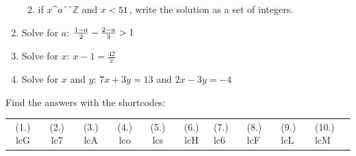 \begin{enumerate}[noitemsep, label=\textbf{\arabic*}. ]
\begin{enumerate}[noitemsep, label=\textbf{\alph*}. ]
\label{m39263*uid128}\item if \begin{math}x\^{a}ˆˆ\mathbb{Z}\end{math} and \begin{math}x<{}51\end{math}, write the solution as a set of integers.
\end{enumerate}
        \hspace{1ex}        
\label{m39263*uid129}\item Solve for \begin{math}a\end{math}: \begin{math}\frac{1-a}{2}-\frac{2-a}{3}>{}1\end{math}\hspace{1ex}        
\label{m39263*uid130}\item Solve for \begin{math}x\end{math}: \begin{math}x-1=\frac{42}{x}\end{math}\hspace{1ex}        
\label{m39263*uid131}\item Solve for \begin{math}x\end{math} and \begin{math}y\end{math}: \begin{math}7x+3y=13\end{math} and \begin{math}2x-3y=-4\end{math}\hspace{1ex}        
\end{enumerate}
        
      
    \label{m39263**end}
          
       
    
  \label{108b030756318cdc732e3f8c9c583cfb**end}
    
\par {} Find the answers with the shortcodes:
 \par \begin{tabular}[h]{cccccc}
 (1.) lcG  &  (2.) lc7  &  (3.) lcA  &  (4.) lco  &  (5.) lcs  &  (6.) lcH  &  (7.) lc6  &  (8.) lcF  &  (9.) lcL  &  (10.) lcM  & \end{tabular}



